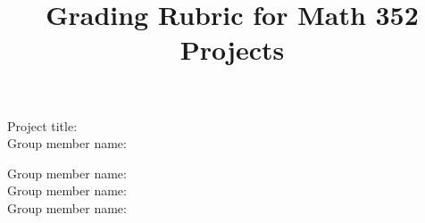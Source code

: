 \documentclass{article}
\title{Grading Rubric for Math 352 Projects}
\begin{document}
\thispagestyle{empty}
\maketitle
\begin{minipage}[t]{0.47\textwidth}
\vspace{0pt}
Project title: \enspace\underline{\hfill} \\[5.0ex]
Group member name: \enspace\underline{\hfill} 
\end{minipage} \hspace{0.5cm}
\begin{minipage}[t]{0.47\textwidth}
\vspace{0pt}
Group member name: \enspace\underline{\hfill} \\[1.0ex]
Group member name: \enspace\underline{\hfill} \\[1.0ex]
Group member name: \enspace\underline{\hfill}
\end{minipage}

\end{document}
